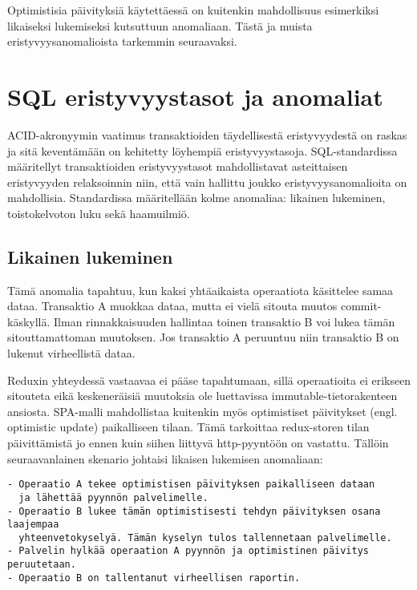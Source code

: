 \documentclass[finnish,twoside,censored,csm,sw-track-2018]{HYthesisML}
\begin{document}
Optimistisia päivityksiä käytettäessä on kuitenkin mahdollisuus esimerkiksi likaiseksi lukemiseksi kutsuttuun anomaliaan. Tästä ja muista eristyvyysanomalioista tarkemmin seuraavaksi.

\section{SQL eristyvyystasot ja anomaliat}

ACID-akronyymin vaatimus transaktioiden täydellisestä eristyvyydestä on raskas ja sitä keventämään on kehitetty löyhempiä eristyvyystasoja. SQL-standardissa \cite{iso-sql-92, gray-ansi} määritellyt transaktioiden eristyvyystasot mahdollistavat asteittaisen eristyvyyden relaksoinnin niin, että vain hallittu joukko eristyvyysanomalioita on mahdollisia. Standardissa määritellään kolme anomaliaa: likainen lukeminen, toistokelvoton luku sekä haamuilmiö.

\subsection{Likainen lukeminen}

Tämä anomalia tapahtuu, kun kaksi yhtäaikaista operaatiota käsittelee samaa dataa. Transaktio A muokkaa dataa, mutta ei vielä sitouta muutos commit-käskyllä. Ilman rinnakkaisuuden hallintaa toinen transaktio B voi lukea tämän sitouttamattoman muutoksen. Jos transaktio A peruuntuu niin transaktio B on lukenut virheellistä dataa.

Reduxin yhteydessä vastaavaa ei pääse tapahtumaan, sillä operaatioita ei erikseen sitouteta eikä keskeneräisiä muutoksia ole luettavissa immutable-tietorakenteen ansiosta. SPA-malli mahdollistaa kuitenkin myös optimistiset päivitykset (engl. optimistic update) paikalliseen tilaan. Tämä tarkoittaa redux-storen tilan päivittämistä jo ennen kuin siihen liittyvä http-pyyntöön on vastattu. Tällöin seuraavanlainen skenario johtaisi likaisen lukemisen anomaliaan:

\begin{Verbatim}[fontsize=\small]
- Operaatio A tekee optimistisen päivityksen paikalliseen dataan 
  ja lähettää pyynnön palvelimelle.
- Operaatio B lukee tämän optimistisesti tehdyn päivityksen osana laajempaa
  yhteenvetokyselyä. Tämän kyselyn tulos tallennetaan palvelimelle. 
- Palvelin hylkää operaation A pyynnön ja optimistinen päivitys peruutetaan.
- Operaatio B on tallentanut virheellisen raportin.
\end{Verbatim}
\end{document}
